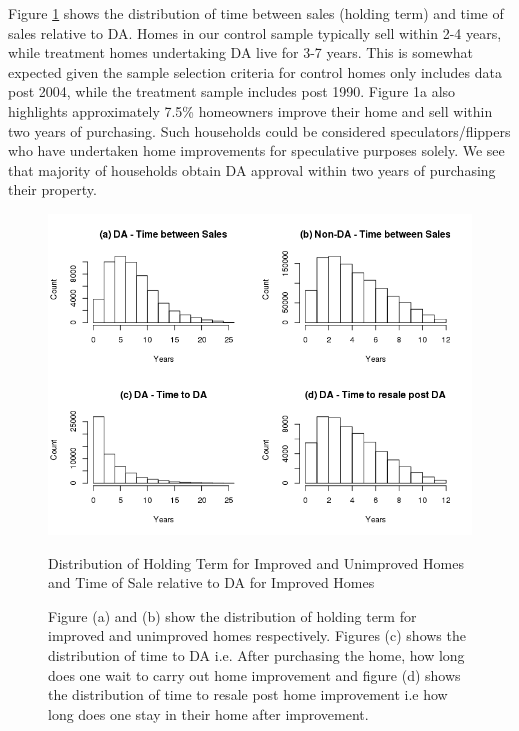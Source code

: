 \documentclass[AEJ,reqno, draftmode]{AEA} %
\begin{document}
  

Figure \ref{fig:Rplot_month_bet_sale_notional} shows the distribution of time between sales (holding term) and time of sales relative to DA. Homes in our control sample typically sell within 2-4 years, while treatment homes undertaking DA live for 3-7 years. This is somewhat expected given the sample selection criteria for control homes only includes data post 2004, while the treatment sample includes post 1990. Figure 1a also highlights approximately 7.5\% homeowners improve their home and sell within two years of purchasing. Such households could be considered speculators/flippers who have undertaken home improvements for speculative purposes solely. We see that majority of households obtain DA approval within two years of purchasing their property. 



\captionsetup[figure]{font=large,skip=0pt}

\begin{figure}[!htb]
    \centering
     \includegraphics[width=\columnwidth]{Figures/Time_bet_sale_notional2004_after_ACT_NT_Rplot.png} \par
 \caption{Distribution of Holding Term for Improved and Unimproved Homes and Time of Sale relative to DA for Improved Homes}
 \label{fig:Rplot_month_bet_sale_notional}
 \caption*{\small Figure (a) and (b) show the distribution of holding term for improved and unimproved homes respectively. Figures (c) shows the distribution of time to DA i.e. After purchasing the home, how long does one wait to carry out home improvement and figure (d) shows the distribution of time to resale post home improvement i.e how long does one stay in their home after improvement.}
  \vspace*{-\baselineskip}
 \end{figure}
\end{document}
